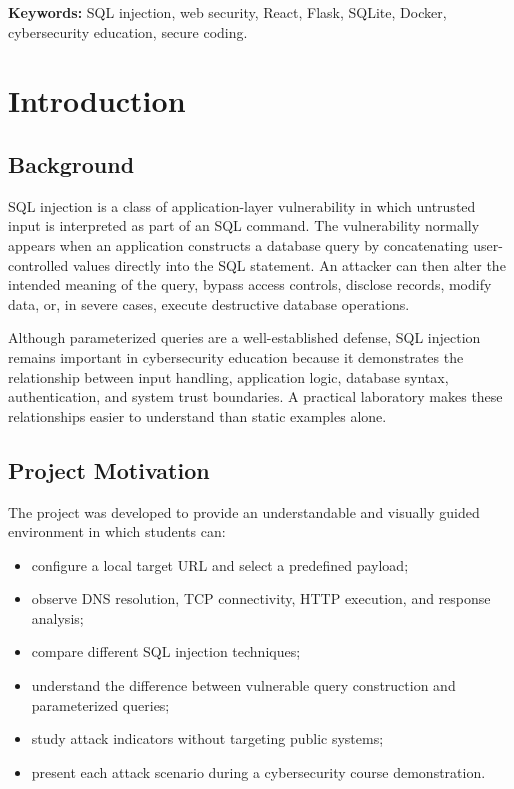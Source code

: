 \documentclass[12pt,a4paper]{article}
\begin{document}
\textbf{Keywords:} SQL injection, web security, React, Flask, SQLite, Docker, cybersecurity education, secure coding.

\newpage
\tableofcontents
\newpage
\listoffigures
\newpage
\listoftables
\newpage


\section{Introduction}

\subsection{Background}

SQL injection is a class of application-layer vulnerability in which untrusted input is interpreted as part of an SQL command. The vulnerability normally appears when an application constructs a database query by concatenating user-controlled values directly into the SQL statement. An attacker can then alter the intended meaning of the query, bypass access controls, disclose records, modify data, or, in severe cases, execute destructive database operations.

Although parameterized queries are a well-established defense, SQL injection remains important in cybersecurity education because it demonstrates the relationship between input handling, application logic, database syntax, authentication, and system trust boundaries. A practical laboratory makes these relationships easier to understand than static examples alone.

\subsection{Project Motivation}

The project was developed to provide an understandable and visually guided environment in which students can:

\begin{itemize}[leftmargin=1.4cm]
    \item configure a local target URL and select a predefined payload;
    \item observe DNS resolution, TCP connectivity, HTTP execution, and response analysis;
    \item compare different SQL injection techniques;
    \item understand the difference between vulnerable query construction and parameterized queries;
    \item study attack indicators without targeting public systems;
    \item present each attack scenario during a cybersecurity course demonstration.
\end{itemize}
\end{document}
